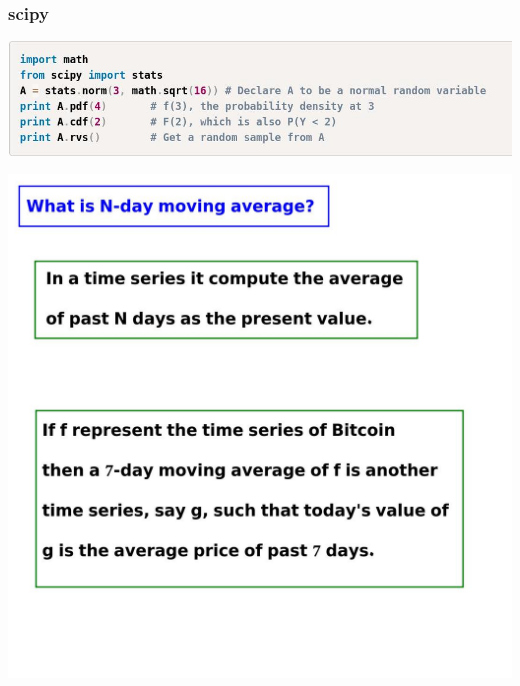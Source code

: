 \documentclass[12pt,aspectratio=169]{beamer}
\begin{document}
\begin{frame}
\frametitle{scipy}
\begin{center}
\includegraphics[scale=0.6]{scipy}
\end{center}
\end{frame}


\begin{frame}
\begin{center}
\includegraphics[scale=0.3]{./pictures/2}
\end{center}
\end{frame}
\end{document}

